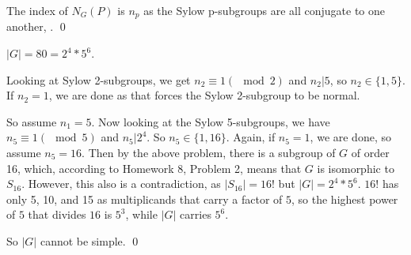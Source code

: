\documentclass[11pt,oneside]{article}
\numberwithin{equation}{section}
\theoremstyle{definition}
\newtheorem{exercise}{Exercise}
\begin{document}
  The index of $N_G(P)$ is $n_p$ as the Sylow p-subgroups are all conjugate to one another, .
  \qed
  
\begin{solution}
  $|G| = 80 = 2^4 * 5^6$.

  Looking at Sylow 2-subgroups, we get $n_2 \equiv 1 ( \mod 2)$ and $ n_2 | 5$, so
  $n_2 \in \{ 1, 5\}$.  If $n_2 = 1$, we are done as that forces the Sylow 2-subgroup
  to be normal.

  So assume $n_1 = 5$.  Now looking at the Sylow 5-subgroups, we have
  $n_5 \equiv 1 (\mod 5)$ and $n_5 | 2^4$.  So $n_5 \in \{1, 16\} $.
  Again, if $n_5 = 1$, we are done, so assume $n_5 = 16$.  Then by the
  above problem, there is a subgroup of $G$ of order 16, which,
  according to Homework 8, Problem 2, means that $G$ is isomorphic to
  $S_{16}$.  However, this also is a contradiction, as $|S_{16}| = 16!$ but
  $|G| = 2^4 * 5^6$.  $16!$ has only 5, 10, and 15 as multiplicands that carry a factor of
  $5$, so the highest power of $5$ that divides $16$ is $5^3$, while $|G|$ carries $5^6$.

  So $|G|$ cannot be simple.  
  \qed
  
\end{solution}

\begin{comment}
  \begin{exercise}
    problem
  \end{exercise}
  \begin{solution}
    \begin{enumerate}[(a)]
    \item
      first answer
    \end{enumerate}
  \end{solution}
\end{comment}
\end{document}

